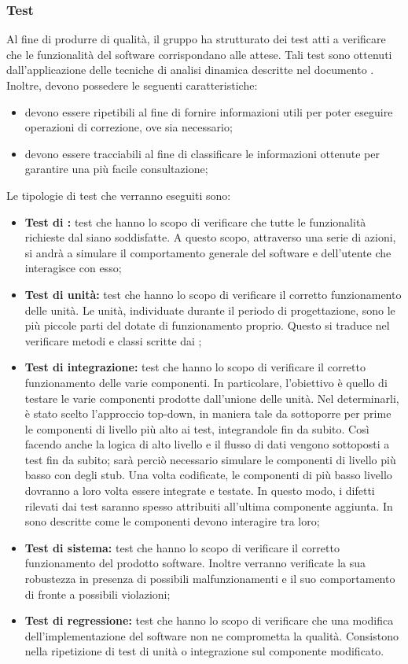 \documentclass[PdQ.tex]{subfiles}
\begin{document}
\subsubsection{Test}
Al fine di produrre  di qualità, il gruppo ha strutturato dei test atti a verificare che le funzionalità del software  corrispondano alle attese.
Tali test sono ottenuti dall'applicazione delle tecniche di analisi dinamica descritte nel documento \NPdoc{}. Inoltre, devono possedere le seguenti caratteristiche:
\begin{itemize}
	\item devono essere ripetibili al fine di fornire informazioni utili per poter eseguire operazioni di correzione, ove sia necessario;
	\item devono essere tracciabili al fine di classificare le informazioni ottenute per garantire una più facile consultazione;
\end{itemize}
Le tipologie di test che verranno eseguiti sono:
\begin{itemize}
\item \textbf{Test di :} test che hanno lo scopo di verificare che tutte le funzionalità richieste dal  siano soddisfatte. A questo scopo, attraverso una serie di
azioni, si andrà a simulare il comportamento generale del software e dell'utente che interagisce con esso;
\item \textbf{Test di unità: } test che  hanno lo scopo di verificare il corretto funzionamento delle unità. Le unità, individuate durante il periodo di progettazione, sono le
		più piccole parti del  dotate di funzionamento proprio. Questo si traduce nel verificare metodi e classi scritte dai \PRP{};
\item \textbf{Test di integrazione: } test che hanno lo scopo di verificare il corretto funzionamento delle varie componenti. In particolare, l'obiettivo è quello di testare le varie componenti prodotte dall'unione delle unità. Nel determinarli, è stato scelto l'approccio top-down, in maniera tale da sottoporre per prime le componenti di livello più alto ai test, integrandole fin da subito. Così facendo anche la logica di alto livello e il flusso di dati vengono sottoposti a test fin da subito; sarà perciò necessario simulare le componenti di livello più basso con degli stub. Una volta codificate, le componenti di più basso livello dovranno a loro volta essere
integrate e testate. In questo modo, i difetti rilevati dai test saranno spesso attribuiti all'ultima componente aggiunta. In \DPdoc{} sono descritte come le componenti devono interagire tra loro;
\item \textbf{Test di sistema: }test che hanno lo scopo di verificare il corretto funzionamento del prodotto software. Inoltre verranno verificate la sua robustezza in presenza di
		possibili malfunzionamenti e il suo comportamento di fronte a possibili violazioni;
\item \textbf{Test di regressione: } test che hanno lo scopo di verificare che una modifica dell'implementazione del software non ne comprometta la qualità. Consistono nella ripetizione di test di unità o integrazione sul componente modificato.
\end{itemize}
\end{document}
